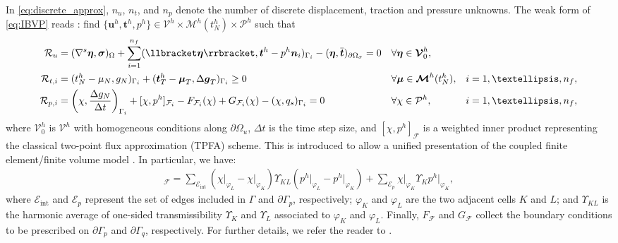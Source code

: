 \documentclass[3p,times]{elsarticle}
\theoremstyle{plain}
\renewcommand{\vec}[1]{\boldsymbol{#1}}
\newcommand{\tensorOne}[1]{\boldsymbol#1}
\newcommand{\tensorTwo}[1]{\boldsymbol#1}
\newcommand{\funSpace}[1]{\mathcal{#1}}
\newcommand{\vecFunSpace}[1]{\boldsymbol{\mathcal{#1}}}
\begin{document}
In \eqref{eq:discrete_approx}, $n_u$, $n_t$, and $n_p$ denote the number of discrete displacement, traction and pressure unknowns.
The weak form of
\eqref{eq:IBVP} reads \cite{fr2020alg}: find $\{\vec{u}^h, \vec{t}^h, p^h\} \in \vecFunSpace{V}^h \times
\vecFunSpace{M}^h(t^h_{N}) \times \funSpace{P}^h$ such that
\begin{subequations}
\begin{align}
  \mathcal{R}_{u} &= ( \nabla^s \tensorOne{ \eta }, \tensorTwo{\sigma} )_{\Omega}
    + \sum_{i=1}^{n_f} ( \llbracket \tensorOne{ \eta } \rrbracket, \tensorOne{ t }^h -
      p^h \tensorOne{n}_i )_{\Gamma_i}
    - ( \tensorOne{\eta}, \bar{\vec{t}} )_{\partial \Omega_{\sigma}}
    = 0 & & \forall \tensorOne{\eta} \in \vecFunSpace{V}^h_0, & \label{eq:weak_form_mom_h} \\
  \mathcal{R}_{t,i} &= ( t_N^h - \mu_N, g_N )_{\Gamma_i}
    + (\vec{t}_T^h - \tensorTwo{\mu}_T, \Delta {\vec{g}}_{T} )_{\Gamma_i} \ge 0 & & \forall \tensorOne{\mu} \in \vecFunSpace{M}^h (t^h_N), & i=1,\ldots,n_f,
    \label{eq:weak_lam_h}\\
  \mathcal{R}_{p,i} &= \left( \chi, \frac{\Delta g_{N} }{\Delta t} \right)_{\Gamma_i}
    + [ \chi, p^h ]_{\mathcal{F}_i} - F_{\mathcal{F}_i}(\chi) + G_{\mathcal{F}_i}(\chi)
    - ( \chi, q_s )_{\Gamma_i} = 0 & & \forall \chi \in \funSpace{P}^h, & i=1,\ldots,n_f, \label{eq:weak_form_mass_h}
\end{align}
\label{eq:weak_form_discr}\null
\end{subequations}
where $\vecFunSpace{V}^h_0$ is $\vecFunSpace{V}^h$ with homogeneous conditions along $\partial\Omega_u$, $\Delta t$ is the time step size, and $[\chi, p^h]_{\mathcal{F}}$ is a weighted inner product representing the classical
two-point flux approximation (TPFA) scheme. This is introduced to allow a unified
presentation of the coupled finite element/finite volume model \cite{EymGalHer00,
EymGalHer07,Age_etal10}. In particular, we have:
\begin{align}
  [\chi, p^h]_{\mathcal{F}} = 
    \sum_{\mathcal{E}_{\text{int}}} (\chi\vert_{\varphi_L} - \chi\vert_{\varphi_K} )
    \Upsilon_{KL} ( p^h\vert_{ \varphi_L } - p^h\vert_{ \varphi_K } ) +
    \sum_{\mathcal{E}_p} \chi\vert_{ \varphi_K } \Upsilon_K p^h\vert_{ \varphi_K },
    \label{eq:FV_inner_product}
\end{align}
where $\mathcal{E}_{\text{int}}$ and $\mathcal{E}_p$ represent the set of edges included
in $\Gamma$ and $\partial\Gamma_{p}$, respectively; $\varphi_K$ and $\varphi_L$ are the
two adjacent cells $K$ and $L$; and $\Upsilon_{KL}$ is the harmonic average of one-sided
transmissibility $\Upsilon_K$ and $\Upsilon_L$ associated to $\varphi_K$ and $\varphi_L$.
Finally, $F_{\mathcal{F}}$ and $G_{\mathcal{F}}$ collect the boundary conditions to be
prescribed on $\partial\Gamma_{p}$ and $\partial\Gamma_{q}$, respectively. For further
details, we refer the reader to \cite{fr2020alg}.
\end{document}

